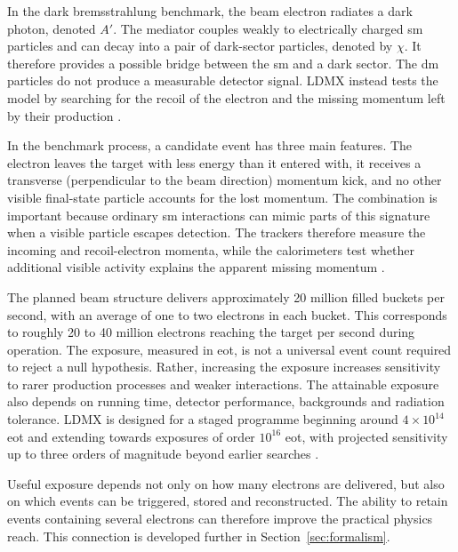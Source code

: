 In the dark bremsstrahlung benchmark, the beam electron radiates a
\gls{dark photon}, denoted \(A'\). The mediator couples weakly to electrically
charged \gls{sm} particles and can decay into a pair of dark-sector particles,
denoted by \(\chi\). It therefore provides a possible bridge between the
\gls{sm} and a dark sector. The \gls{dm} particles do not produce a
measurable detector signal. LDMX instead tests the model by searching for the
recoil of the electron and the missing momentum left by their production
\cite{akesson2018-ldmx,ldmx2025-overview}.

In the benchmark process, a candidate event has three main features. The electron leaves the target
with less energy than it entered with, it receives a transverse (perpendicular to the beam direction)
momentum kick, and no other visible final-state particle accounts for the
lost momentum. The combination is important because ordinary
\gls{sm} interactions can mimic parts of this signature when a
visible particle escapes detection. The trackers therefore measure the
incoming and recoil-electron momenta, while the calorimeters test whether
additional visible activity explains the apparent missing momentum
\cite{akesson2018-ldmx,ldmx2025-overview}.

The planned beam structure delivers approximately 20 million filled buckets
per second, with an average of one to two electrons in each bucket. This
corresponds to roughly 20 to 40 million electrons reaching the target per
second during operation. The exposure, measured in \gls{eot}, is not a
universal event count required to reject a null hypothesis. Rather, increasing
the exposure increases sensitivity to rarer production processes and weaker
interactions. The attainable exposure also depends on running time, detector
performance, backgrounds and radiation tolerance. LDMX is designed for a
staged programme beginning around \(4\times10^{14}\) \gls{eot} and extending
towards exposures of order \(10^{16}\) \gls{eot}, with projected sensitivity
up to three orders of magnitude beyond earlier searches
\cite{ldmx2025-overview}.

Useful exposure depends not only on how many electrons are delivered, but
also on which events can be triggered, stored and reconstructed. The ability
to retain events containing several electrons can therefore improve the
practical physics reach. This connection is developed further in
Section~\ref{sec:formalism}.

